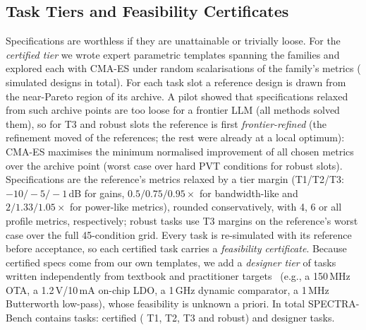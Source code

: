 \subsection{Task Tiers and Feasibility Certificates}
Specifications are worthless if they are unattainable or trivially loose. For the \emph{certified tier} we wrote
\NTemplates{} expert parametric templates spanning the families and explored each with CMA-ES under random
scalarisations of the family's metrics (\NExploreEvals{} simulated designs in total). For each task slot a reference
design is drawn from the near-Pareto region of its archive. A pilot showed that specifications relaxed from such
archive points are too loose for a frontier LLM (all methods solved them), so for T3 and robust slots the
reference is first \emph{frontier-refined} (the refinement moved \NFrontier{} of the \NHard{} references; the
rest were already at a local optimum): CMA-ES maximises the minimum normalised improvement of all chosen metrics
over the archive point (worst case over hard PVT conditions for robust slots). Specifications are the reference's
metrics relaxed by a tier margin (T1/T2/T3: $-10/-5/-1$\,dB for gains, $0.5/0.75/0.95\times$ for bandwidth-like
and $2/1.33/1.05\times$ for power-like metrics), rounded conservatively, with 4, 6 or all profile metrics,
respectively; robust tasks use T3 margins on the reference's worst case over the full 45-condition grid. Every
task is re-simulated with its reference before acceptance, so each certified task carries a \emph{feasibility
certificate}. Because certified specs come from our own templates, we add a \emph{designer tier} of \NDesigner{}
tasks written independently from textbook and practitioner targets~\cite{allen2012cmos,razavi2017design} (e.g., a
150\,MHz OTA, a 1.2\,V/10\,mA on-chip LDO, a 1\,GHz dynamic comparator, a 1\,MHz Butterworth low-pass), whose
feasibility is unknown a priori.
In total SPECTRA-Bench contains \NTasksTotal{} tasks: \NCertified{} certified (\NTOne{} T1, \NTTwo{} T2, \NTThree{} T3 and \NRobust{} robust) and \NDesigner{} designer tasks.

